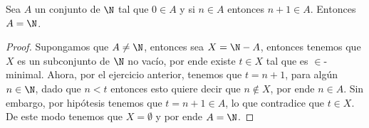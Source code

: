 \begin{exercise}[1.9 (Inducción)]
  Sea $A$ un conjunto de $\N$ tal que $0 \in A$ y si $n \in A$ entonces $n+1 \in A$. Entonces $A = \N$.
\end{exercise}
\begin{proof}
  Supongamos que $A \neq \N$, entonces sea $X = \N - A$, entonces tenemos que $X$ es un subconjunto de $\N$ no vacío, por ende existe $t \in X$ tal que es $\in$-minimal. Ahora, por el ejercicio anterior, tenemos que $t = n+1$, para algún $n \in \N$, dado que $n < t$ entonces esto quiere decir que $n \notin X$, por ende $n \in A$. Sin embargo, por hipótesis tenemos que $t = n+1 \in A$, lo que contradice que $t \in X$. De este modo tenemos que $X = \emptyset$ y por ende $A = \N$.
\end{proof}